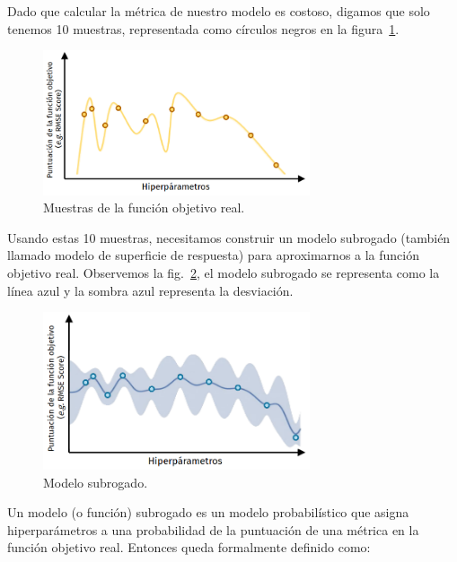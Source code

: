 \documentclass[a4paper,12pt]{article}
\begin{document}
Dado que calcular la métrica de nuestro modelo es costoso, digamos que solo tenemos 10 muestras, representada como círculos negros en la figura~\ref{fig:bayes7}.

\begin{figure}[H]
	\begin{center}
		\includegraphics[width=0.7\textwidth]{bayes_opt_7_v2.png}
		\caption{Muestras de la función objetivo real.}
		\label{fig:bayes7}
	\end{center}
\end{figure}

Usando estas 10 muestras, necesitamos construir un modelo subrogado (también llamado modelo de superficie de respuesta) para aproximarnos a la función objetivo real. Observemos la fig.~\ref{fig:bayes8}, el modelo subrogado se representa como la línea azul y la sombra azul representa la desviación.

\begin{figure}[H]
	\begin{center}
		\includegraphics[width=0.7\textwidth]{bayes_opt_8_v2.png}
		\caption{Modelo subrogado.}
		\label{fig:bayes8}
	\end{center}
\end{figure}

Un modelo (o función) subrogado es un modelo probabilístico que asigna hiperparámetros a una probabilidad de la puntuación de una métrica en la función objetivo real. Entonces queda formalmente definido como:
\end{document}
